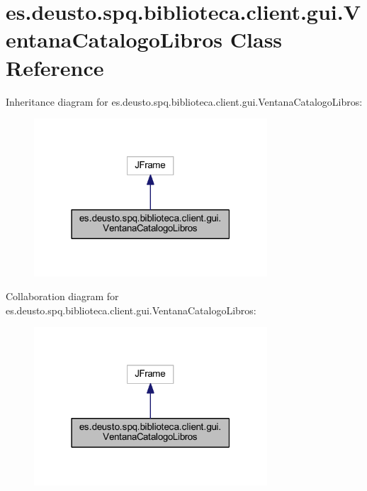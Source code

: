 \hypertarget{classes_1_1deusto_1_1spq_1_1biblioteca_1_1client_1_1gui_1_1_ventana_catalogo_libros}{}\section{es.\+deusto.\+spq.\+biblioteca.\+client.\+gui.\+Ventana\+Catalogo\+Libros Class Reference}
\label{classes_1_1deusto_1_1spq_1_1biblioteca_1_1client_1_1gui_1_1_ventana_catalogo_libros}


Inheritance diagram for es.\+deusto.\+spq.\+biblioteca.\+client.\+gui.\+Ventana\+Catalogo\+Libros\+:
\nopagebreak
\begin{figure}[H]
\begin{center}
\leavevmode
\includegraphics[width=247pt]{classes_1_1deusto_1_1spq_1_1biblioteca_1_1client_1_1gui_1_1_ventana_catalogo_libros__inherit__graph}
\end{center}
\end{figure}


Collaboration diagram for es.\+deusto.\+spq.\+biblioteca.\+client.\+gui.\+Ventana\+Catalogo\+Libros\+:
\nopagebreak
\begin{figure}[H]
\begin{center}
\leavevmode
\includegraphics[width=247pt]{classes_1_1deusto_1_1spq_1_1biblioteca_1_1client_1_1gui_1_1_ventana_catalogo_libros__coll__graph}
\end{center}
\end{figure}
